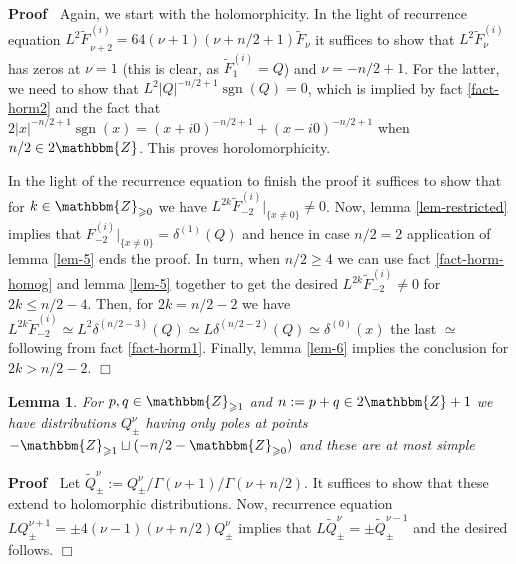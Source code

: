 \documentclass{article}
\newcommand{\assign}{:=}
\newcommand{\tmop}[1]{\ensuremath{\operatorname{#1}}}
\newenvironment{proof}{\noindent\textbf{Proof\ }}{\hspace*{\fill}$\Box$\medskip}
\numberwithin{definition}{section}
\newtheorem{lemma}{Lemma}
\numberwithin{lemma}{section}
\numberwithin{proposition}{section}
{\theorembodyfont{\rmfamily}\newtheorem{remark}{Remark}
\numberwithin{remark}{section}
}
\begin{document}
\begin{proof}
  Again, we start with the holomorphicity. In the light of recurrence equation
  $L^2 \widetilde{F_{}}_{\nu + 2}^{( i)} = 64 ( \nu + 1) ( \nu + n / 2 + 1)
  \tilde{F}_{\nu}$ it suffices to show that $L^2 \tilde{F}_{\nu}^{( i)}$ has
  zeros at $\nu = 1$ (this is clear, as $\tilde{F}_1^{( i)} = Q$) and $\nu = -
  n / 2 + 1$. For the latter, we need to show that $L^2 | Q |^{- n / 2 + 1}
  \tmop{sgn} ( Q) = 0$, which is implied by fact \ref{fact-horm2} and the fact
  that $2 | x |^{- n / 2 + 1} \tmop{sgn} ( x) = ( x + i 0)^{- n / 2 + 1} + ( x
  - i 0)^{- n / 2 + 1}$ when $n / 2 \in 2\mathbbm{Z}$. This proves
  horolomorphicity.
  
  In the light of the recurrence equation to finish the proof it suffices to
  show that for $k \in \mathbbm{Z}_{\geqslant 0}$ we have $L^{2 k}
  \tilde{F}_{- 2}^{( i)} |_{\{ x \neq 0 \}} \neq 0$. Now, lemma
  \ref{lem-restricted} implies that $F^{( i)}_{- 2} |_{\{ x \neq 0 \}} =
  \delta^{( 1)} ( Q)$ and hence in case $n / 2 = 2$ application of lemma
  \ref{lem-5} ends the proof. In turn, when $n / 2 \geqslant 4$ we can use
  fact \ref{fact-horm-homog} and lemma \ref{lem-5} together to get the desired
  $L^{2 k} \tilde{F}_{- 2}^{( i)} \neq 0$ for $2 k \leqslant n / 2 - 4$. Then,
  for $2 k = n / 2 - 2$ we have $L^{2 k} \tilde{F}_{- 2}^{( i)} \simeq L^2
  \delta^{( n / 2 - 3)} ( Q) \simeq L \delta^{( n / 2 - 2)} ( Q) \simeq
  \delta^{( 0)} ( x)$ the last $\simeq$ following from fact \ref{fact-horm1}.
  Finally, lemma \ref{lem-6} implies the conclusion for $2 k > n / 2 - 2$.
\end{proof}

\begin{lemma}
  \label{lem-n:odd-holo}For $p, q \in \mathbbm{Z}_{\geqslant 1}$ and $n
  \assign p + q \in 2\mathbbm{Z}+ 1$ we have distributions $Q_{\pm}^{\nu}$
  having only poles at points $-\mathbbm{Z}_{\geqslant 1} \sqcup ( - n / 2
  -\mathbbm{Z}_{\geqslant 0})$ and these are at most simple
\end{lemma}

\begin{proof}
  Let $\tilde{Q}^{\nu}_{\pm} \assign Q_{\pm}^{\nu} / \Gamma ( \nu + 1) /
  \Gamma ( \nu + n / 2)$. It suffices to show that these extend to holomorphic
  distributions. Now, recurrence equation $L Q_{\pm}^{\nu + 1} = \pm 4 ( \nu -
  1) ( \nu + n / 2) Q_{\pm}^{\nu}$ implies that $L \tilde{Q}_{\pm}^{\nu} = \pm
  \tilde{Q}_{\pm}^{\nu - 1}$ and the desired follows.
\end{proof}
\end{document}
